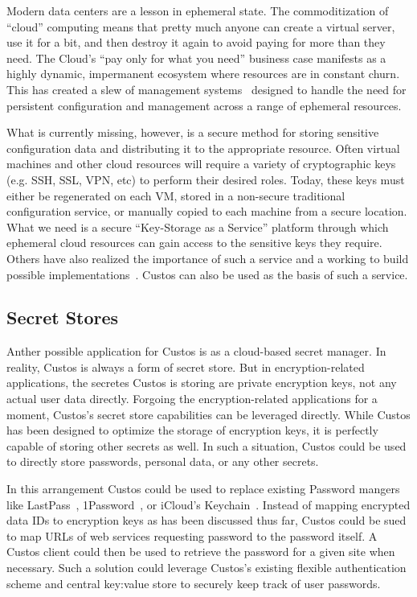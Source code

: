 Modern data centers are a lesson in ephemeral state. The
commoditization of ``cloud'' computing means that pretty much anyone
can create a virtual server, use it for a bit, and then destroy it
again to avoid paying for more than they need. The Cloud's ``pay only
for what you need'' business case manifests as a highly dynamic,
impermanent ecosystem where resources are in constant churn. This has
created a slew of management systems~\cite{chef, salt, puppet}
designed to handle the need for persistent configuration and
management across a range of ephemeral resources.

What is currently missing, however, is a secure method for storing
sensitive configuration data and distributing it to the appropriate
resource. Often virtual machines and other cloud resources will
require a variety of cryptographic keys (e.g. SSH, SSL, VPN, etc) to
perform their desired roles. Today, these keys must either be
regenerated on each VM, stored in a non-secure traditional
configuration service, or manually copied to each machine from a
secure location. What we need is a secure ``Key-Storage as a Service''
platform through which ephemeral cloud resources can gain access to
the sensitive keys they require. Others have also realized the
importance of such a service and a working to build possible
implementations~\cite{cloudkeep-presentation, cloudkeep,
  gazzang}. Custos can also be used as the basis of such a service.

\subsection{Secret Stores}

Anther possible application for Custos is as a cloud-based secret
manager. In reality, Custos is always a form of secret store. But in
encryption-related applications, the secretes Custos is storing are
private encryption keys, not any actual user data directly. Forgoing
the encryption-related applications for a moment, Custos's secret store
capabilities can be leveraged directly. While Custos has been designed
to optimize the storage of encryption keys, it is perfectly capable of
storing other secrets as well. In such a situation, Custos could be
used to directly store passwords, personal data, or any other secrets.

In this arrangement Custos could be used to replace existing Password
mangers like LastPass~\cite{lastpass}, 1Password~\cite{onepassword}, or
iCloud's Keychain~\cite{icloud}. Instead of mapping encrypted data IDs
to encryption keys as has been discussed thus far, Custos could be
sued to map URLs of web services requesting password to the password
itself. A Custos client could then be used to retrieve the password
for a given site when necessary. Such a solution could leverage
Custos's existing flexible authentication scheme and central key:value
store to securely keep track of user passwords.

